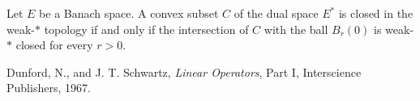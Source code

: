 \documentclass[12pt]{article}
\begin{document}
Let $E$ be a Banach space.  A convex subset $C$ of the dual
space $E^*$ is closed in the weak-$*$ topology if and only
if the intersection of $C$ with the
ball $B_{r}(0)$ is weak-$*$ closed for every $r>0$.

\begin{thebibliography}{1}
Dunford, N., and J. T. Schwartz, \emph{Linear Operators}, 
Part I, Interscience Publishers, 1967.
\end{thebibliography}
\end{document}
